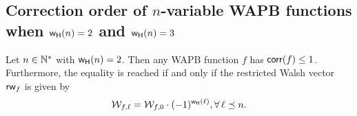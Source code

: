 \documentclass[11pt]{llncs}
\begin{document}
%



\subsection{Correction order of $n$-variable WAPB functions when $\mathsf{w_H}(n)=2$ and $\mathsf{w_H}(n)=3$}



\begin{proposition}\label{prop:t=2} Let $n\in \mathbb{N}^*$ with $\mathsf{w_H}(n)=2$. Then any WAPB function $f$ has $\mathsf{corr}(f)\leq 1$.
	Furthermore, the equality is reached if and only if the restricted Walsh vector $\mathsf{rw}_{f}$ is given by
	\[
	\mathcal{W}_{f,\ell} =   \mathcal{W}_{f,0} \cdot (-1)^{\mathsf{w_H}(\ell)}, \forall \, \ell \preceq n.
	\]
\end{proposition}
\end{document}
